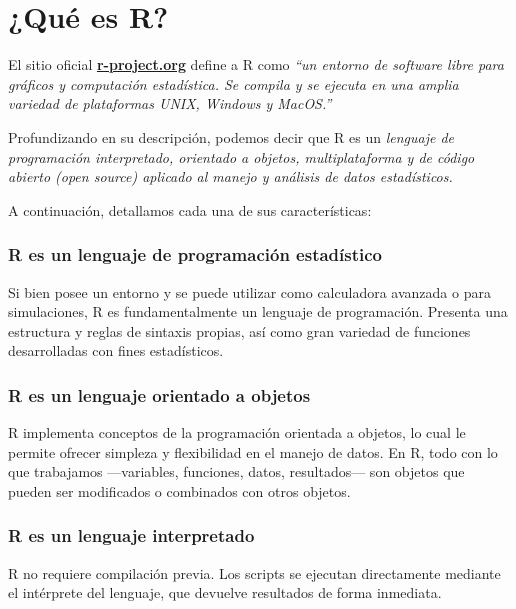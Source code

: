 \documentclass[
  spanish,
  a4paper,
]{scrbook}
\begin{document}
\section{¿Qué es R?}\label{quuxe9-es-r}

El sitio oficial
\href{https://www.r-project.org/}{\textbf{r-project.org}} define a R
como \emph{``un entorno de software libre para gráficos y computación
estadística. Se compila y se ejecuta en una amplia variedad de
plataformas UNIX, Windows y MacOS.''}

Profundizando en su descripción, podemos decir que R es un
\emph{lenguaje de programación interpretado, orientado a objetos,
multiplataforma y de código abierto (open source) aplicado al manejo y
análisis de datos estadísticos.}

A continuación, detallamos cada una de sus características:

\subsubsection{R es un lenguaje de programación
estadístico}\label{r-es-un-lenguaje-de-programaciuxf3n-estaduxedstico}

Si bien posee un entorno y se puede utilizar como calculadora avanzada o
para simulaciones, R es fundamentalmente un lenguaje de programación.
Presenta una estructura y reglas de sintaxis propias, así como gran
variedad de funciones desarrolladas con fines estadísticos.

\subsubsection{R es un lenguaje orientado a
objetos}\label{r-es-un-lenguaje-orientado-a-objetos}

R implementa conceptos de la programación orientada a objetos, lo cual
le permite ofrecer simpleza y flexibilidad en el manejo de datos. En R,
todo con lo que trabajamos ---variables, funciones, datos, resultados---
son objetos que pueden ser modificados o combinados con otros objetos.

\subsubsection{R es un lenguaje
interpretado}\label{r-es-un-lenguaje-interpretado}

R no requiere compilación previa. Los scripts se ejecutan directamente
mediante el intérprete del lenguaje, que devuelve resultados de forma
inmediata.
\end{document}
